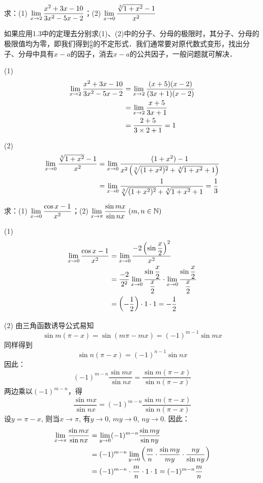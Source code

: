 \begin{example}
求：(1) $\displaystyle\lim_{x\to 2}\dfrac{x^2+3x-10}{3x^2-5x-2}$；\qquad (2) $\displaystyle\lim_{x\to 0}\dfrac{\sqrt[3]{1+x^2}-1}{x^2}$
\end{example}

\begin{solution}
    如果应用1.3中的定理去分别求(1)、(2)中的分子、分母的极限时，其分子、分母的极限值均为零，即我们得到$\frac{0}{0}$的不定形式．我们通常要对原代数式变形，找出分子、分母中具有$x-a$的因子，消去$x-a$的公共因子，一般问题就可解决．

(1)
\[\begin{split}
    \displaystyle\lim_{x\to 2}\dfrac{x^2+3x-10}{3x^2-5x-2}&=\displaystyle\lim_{x\to 2}\dfrac{(x+5)(x-2)}{(3x+1)(x-2)}\\
    &=\displaystyle\lim_{x\to 2}\dfrac{x+5}{3x+1}\\
    &=\dfrac{2+5}{3\times 2+1}=1
\end{split}\]

(2)
\[\begin{split}
    \displaystyle\lim_{x\to 0}\dfrac{\sqrt[3]{1+x^2}-1}{x^2}&=\displaystyle\lim_{x\to 0}\dfrac{{(1+x^2)}-1}{x^2\left(\sqrt[3]{(1+x^2)^2}+\sqrt[3]{1+x^2}+1\right)}\\
    &=\displaystyle\lim_{x\to 0}\dfrac{1}{\sqrt[3]{(1+x^2)^2}+\sqrt[3]{1+x^2}+1}=\dfrac{1}{3}
\end{split}\]
\end{solution}

\begin{example}
    求：(1) $\displaystyle\lim_{x\to 0}\dfrac{\cos x-1}{x^2}$；\qquad (2) $\displaystyle\lim_{x\to \pi}\dfrac{\sin mx}{\sin nx}\;(m,n\in \mathbb{N})$
\end{example}

\begin{solution}
(1)
\[\begin{split}
    \displaystyle\lim_{x\to 0}\dfrac{\cos x-1}{x^2}&=\displaystyle\lim_{x\to 0}\dfrac{-2\left(\sin\dfrac{x}{2}\right)^2}{x^2}\\
    &=\dfrac{-2}{2^2}\displaystyle\lim_{x\to 0}\dfrac{\sin\dfrac{x}{2}}{\dfrac{x}{2}}\cdot \displaystyle\lim_{x\to 0}\dfrac{\sin\dfrac{x}{2}}{\dfrac{x}{2}}\\
    &=\left(-\dfrac{1}{2}\right)\cdot 1\cdot 1=-\dfrac{1}{2}
\end{split}\]

(2) 由三角函数诱导公式易知
\[\sin m(\pi-x)=\sin(m\pi-mx)=(-1)^{m-1}\sin mx\]
同样得到
\[\sin n(\pi-x)=(-1)^{n-1}\sin nx\]
因此：
\[(-1)^{m-n}\frac{\sin mx}{\sin nx}=\frac{\sin m(\pi-x)}{\sin n(\pi-x)}\]
两边乘以$(-1)^{m-n}$，得
\[\frac{\sin mx}{\sin nx}=(-1)^{m-n}\frac{\sin m(\pi-x)}{\sin n(\pi-x)}\]
设$y=\pi-x$, 则当$x\to \pi$, 有$y\to 0$, $my\to 0$, $ny\to 0$. 因此：
\[\begin{split}
    \displaystyle\lim_{x\to \pi}\dfrac{\sin mx}{\sin nx}&=\lim_{y\to 0}(-1)^{m-n}\dfrac{\sin my}{\sin ny}\\
&=(-1)^{m-n}\lim_{y\to 0}\left(\dfrac{m}{n}\cdot \dfrac{\sin my}{my}\cdot \dfrac{ny}{\sin ny}\right)\\
&=(-1)^{m-n}\cdot \dfrac{m}{n}\cdot 1\cdot 1=(-1)^{m-n}\dfrac{m}{n}
\end{split}\]
\end{solution}

